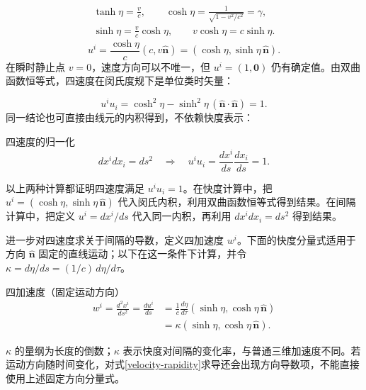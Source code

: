\documentclass[a4paper,12pt]{article}
\begin{document}
\begin{equation}\label{rapidity-identities}
\begin{gathered}\tanh\eta=\frac vc,\qquad\cosh\eta=\frac1{\sqrt{1-v^2/c^2}}=\gamma,\\\sinh\eta=\frac vc\cosh\eta,\qquad v\cosh\eta=c\sinh\eta.\end{gathered}
\end{equation}
\begin{equation}\label{velocity-rapidity}
u^i=\frac{\cosh\eta}{c}(c,v\widehat{\boldsymbol n})=(\cosh\eta,\sinh\eta\,\widehat{\boldsymbol n}).
\end{equation}
在瞬时静止点 $v=0$，速度方向可以不唯一，但 $u^i=(1,\boldsymbol 0)$ 仍有确定值。由双曲函数恒等式，四速度在闵氏度规下是单位类时矢量：

\begin{equation}\label{velocity-unit-rapidity}
u^iu_i=\cosh^2\eta-\sinh^2\eta\,(\widehat{\boldsymbol n}\cdot\widehat{\boldsymbol n})=1.
\end{equation}
同一结论也可直接由线元的内积得到，不依赖快度表示：

\begin{resultBox}{四速度的归一化}
\begin{equation}\label{velocity-unit-interval}
dx^i dx_i=ds^2\quad\Longrightarrow\quad u^iu_i=\frac{dx^i}{ds}\frac{dx_i}{ds}=1.
\end{equation}
\end{resultBox}

以上两种计算都证明四速度满足 $u^iu_i=1$。在快度计算中，把 $u^i=(\cosh\eta,\sinh\eta\,\widehat{\boldsymbol n})$ 代入闵氏内积，利用双曲函数恒等式得到结果。在间隔计算中，把定义 $u^i=dx^i/ds$ 代入同一内积，再利用 $dx^idx_i=ds^2$ 得到结果。

进一步对四速度求关于间隔的导数，定义四加速度 $w^i$。下面的快度分量式适用于方向 $\widehat{\boldsymbol n}$ 固定的直线运动；以下在这一条件下计算，并令 $\kappa=d\eta/ds=(1/c)\,d\eta/d\tau$。

\begin{definitionBox}{四加速度（固定运动方向）}
\begin{equation}\label{four-acceleration}
\begin{aligned}w^i=\frac{d^2x^i}{ds^2}=\frac{du^i}{ds}&=\frac1c\frac{d\eta}{d\tau}(\sinh\eta,\cosh\eta\,\widehat{\boldsymbol n})\\&=\kappa(\sinh\eta,\cosh\eta\,\widehat{\boldsymbol n}).\end{aligned}
\end{equation}
\end{definitionBox}
$\kappa$ 的量纲为长度的倒数；$\kappa$ 表示快度对间隔的变化率，与普通三维加速度不同。若运动方向随时间变化，对式\eqref{velocity-rapidity}求导还会出现方向导数项，不能直接使用上述固定方向分量式。
\end{document}
